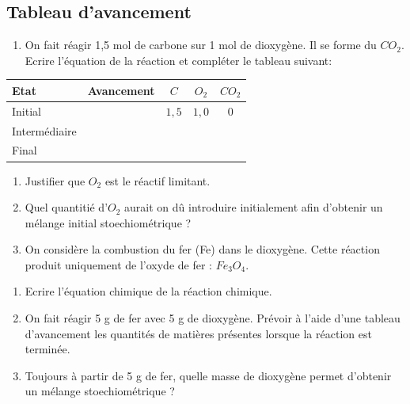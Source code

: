 \documentclass[
]{book}
\providecommand{\tightlist}{%
  \setlength{\itemsep}{0pt}\setlength{\parskip}{0pt}}
\def\tightlist{}
\begin{document}
\hypertarget{tableau-davancement}{%
\subsection{Tableau d'avancement}\label{tableau-davancement}}

\begin{enumerate}
\def\labelenumi{\arabic{enumi}.}
\tightlist
\item
  On fait réagir 1,5 mol de carbone sur 1 mol de dioxygène. Il se forme du \(CO_2\). Ecrire l'équation de la réaction et compléter le tableau suivant:
\end{enumerate}

\begin{longtable}[]{@{}llccc@{}}
\toprule
Etat & Avancement & \(C\) & \(O_2\) & \(CO_2\) \\
\midrule
\endhead
Initial & & \(1,5\) & \(1,0\) & \(0\) \\
Intermédiaire & & & & \\
Final & & & & \\
\bottomrule
\end{longtable}

\begin{enumerate}
\def\labelenumi{\arabic{enumi}.}
\setcounter{enumi}{1}
\item
  Justifier que \(O_2\) est le réactif limitant.
\item
  Quel quantitié d'\(O_2\) aurait on dû introduire initialement afin d'obtenir un mélange initial stoechiométrique ?
\item
  On considère la combustion du fer (Fe) dans le dioxygène. Cette réaction produit uniquement de l'oxyde de fer : \(Fe_3O_4\).
\end{enumerate}

\begin{enumerate}
\def\labelenumi{\alph{enumi}.}
\tightlist
\item
  Ecrire l'équation chimique de la réaction chimique.
\item
  On fait réagir 5 g de fer avec 5 g de dioxygène. Prévoir à l'aide d'une tableau d'avancement les quantités de matières présentes lorsque la réaction est terminée.
\item
  Toujours à partir de 5 g de fer, quelle masse de dioxygène permet d'obtenir un mélange stoechiométrique ?
\end{enumerate}
\end{document}

